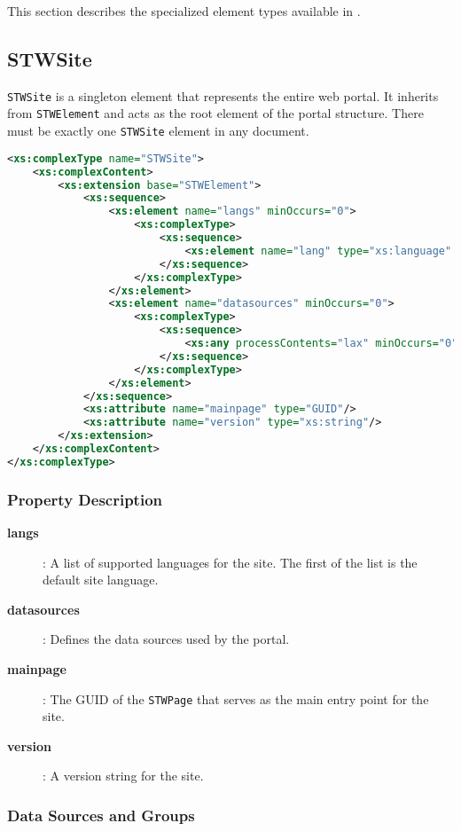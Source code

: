 This section describes the specialized element types available in \wbdl{}.

\subsection{STWSite}

	\texttt{STWSite} is a singleton element that represents the entire web portal. It inherits from \texttt{STWElement} and acts as the root element of the portal structure. There must be exactly one \texttt{STWSite} element in any \wbdl{} document.

\begin{lstlisting}[language=XML,caption={STWSite Type Definition}]
<xs:complexType name="STWSite">
	<xs:complexContent>
		<xs:extension base="STWElement">
			<xs:sequence>
				<xs:element name="langs" minOccurs="0">
					<xs:complexType>
						<xs:sequence>
							<xs:element name="lang" type="xs:language" maxOccurs="unbounded"/>
						</xs:sequence>
					</xs:complexType>
				</xs:element>
				<xs:element name="datasources" minOccurs="0">
					<xs:complexType>
						<xs:sequence>
							<xs:any processContents="lax" minOccurs="0" maxOccurs="unbounded"/>
						</xs:sequence>
					</xs:complexType>
				</xs:element>
			</xs:sequence>
			<xs:attribute name="mainpage" type="GUID"/>
			<xs:attribute name="version" type="xs:string"/>
		</xs:extension>
	</xs:complexContent>
</xs:complexType>
\end{lstlisting}

\subsubsection{Property Description}

\begin{description}
\item[\textbf{langs}]: A list of supported languages for the site. The first of the list is the default site language.
\item[\textbf{datasources}]: Defines the data sources used by the portal.
\item[\textbf{mainpage}]: The GUID of the \texttt{STWPage} that serves as the main entry point for the site.
\item[\textbf{version}]: A version string for the site.
\end{description}

\subsubsection{Data Sources and Groups}
\label{sec:datasources-groups}

